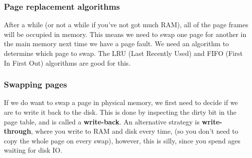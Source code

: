 \subsubsection{Page replacement algorithms}

After a while (or not a while if you've not got much RAM), all of the page
frames will be occupied in memory. This means we need to swap one page for
another in the main memory next time we have a page fault. We need an algorithm
to determine which page to swap. The LRU (Last Recently Used) and FIFO (First In
First Out) algorithms are good for this.

\subsubsection{Swapping pages}

If we do want to swap a page in physical memory, we first need to decide if we
are to write it back to the disk. This is done by inspecting the dirty bit in
the page table, and is called a \textbf{write-back}. An alternative strategy is
\textbf{write-through}, where you write to RAM and disk every time, (so you
don't need to copy the whole page on every swap), however, this is silly, since
you spend ages waiting for disk IO.


